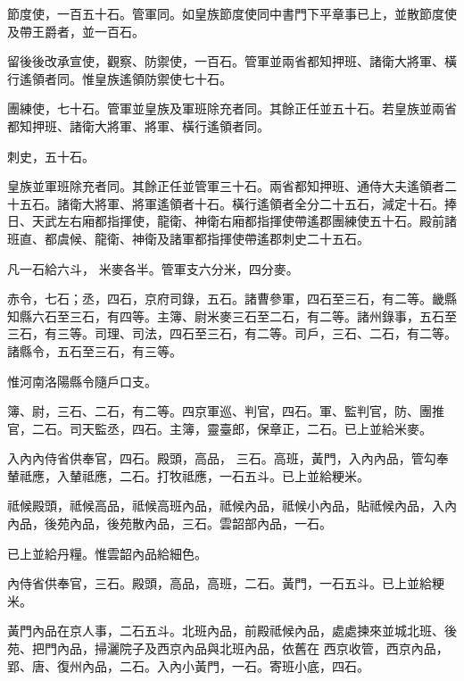 \begin{pinyinscope}
 節度使，一百五十石。管軍同。如皇族節度使同中書門下平章事已上，並散節度使及帶王爵者，並一百石。



 留後後改承宣使，觀察、防禦使，一百石。管軍並兩省都知押班、諸衛大將軍、橫行遙領者同。惟皇族遙領防禦使七十石。



 團練使，七十石。管軍並皇族及軍班除充者同。其餘正任並五十石。若皇族並兩省都知押班、諸衛大將軍、將軍、橫行遙領者同。



 刺史，五十石。



 皇族並軍班除充者同。其餘正任並管軍三十石。兩省都知押班、通侍大夫遙領者二十五石。諸衛大將軍、將軍遙領者十石。橫行遙領者全分二十五石，減定十石。捧日、天武左右廂都指揮使，龍衛、神衛右廂都指揮使帶遙郡團練使五十石。殿前諸班直、都虞候、龍衛、神衛及諸軍都指揮使帶遙郡刺史二十五石。



 凡一石給六斗，
 米麥各半。管軍支六分米，四分麥。



 赤令，七石；丞，四石，京府司錄，五石。諸曹參軍，四石至三石，有二等。畿縣知縣六石至三石，有四等。主簿、尉米麥三石至二石，有二等。諸州錄事，五石至三石，有三等。司理、司法，四石至三石，有二等。司戶，三石、二石，有二等。諸縣令，五石至三石，有三等。



 惟河南洛陽縣令隨戶口支。



 簿、尉，三石、二石，有二等。四京軍巡、判官，四石。軍、監判官，防、團推官，二石。司天監丞，四石。主簿，靈臺郎，保章正，二石。已上並給米麥。



 入內內侍省供奉官，四石。殿頭，高品，
 三石。高班，黃門，入內內品，管勾奉輦祗應，入輦祗應，二石。打牧祗應，一石五斗。已上並給粳米。



 祗候殿頭，祗候高品，祗候高班內品，祗候內品，祗候小內品，貼祗候內品，入內內品，後苑內品，後苑散內品，三石。雲韶部內品，一石。



 已上並給丹糧。惟雲韶內品給細色。



 內侍省供奉官，三石。殿頭，高品，高班，二石。黃門，一石五斗。已上並給粳米。



 黃門內品在京人事，二石五斗。北班內品，前殿祗候內品，處處揀來並城北班、後苑、把門內品，掃灑院子及西京內品與北班內品，依舊在
 西京收管，西京內品，郢、唐、復州內品，二石。入內小黃門，一石。寄班小底，四石。




\end{pinyinscope}

